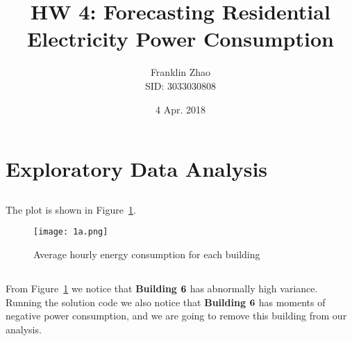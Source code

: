 \documentclass[12pt]{article}
\title{HW 4: Forecasting Residential Electricity Power Consumption}
\date{4 Apr. 2018}
\author{Franklin Zhao \\ SID: 3033030808}
\begin{document}
	
	\maketitle
	\newcommand{\tabitem}{~~\llap{\textbullet}~~}
	\renewcommand\theequation{\arabic{equation}}
	\renewcommand{\figurename}{Fig.}
	\renewcommand\thesection{Problem \arabic{section}:}
	\renewcommand\thesubsection{(\alph{subsection})}
	\onehalfspacing
	
\section{Exploratory Data Analysis}
\subsection{}
The plot is shown in Figure~\ref{fig:1a}.
\begin{figure}[H]
	\centering
	\texttt{[image: 1a.png]}
	\vspace{-1cm}      
	\caption{Average hourly energy consumption for each building}
	\label{fig:1a}
\end{figure}
\subsection{}
\noindent From Figure~\ref{fig:1a} we notice that \textbf{Building} $\bf{6}$ has abnormally high variance. Running the solution code we also notice that \textbf{Building} $\bf{6}$ has moments of negative power consumption, and we are going to remove this building from our analysis.
\end{document}
